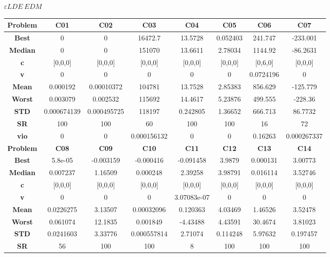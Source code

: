 \documentclass{IEEEtran}
\begin{document}
\begin{center}
$\varepsilon LDE\ EDM$\\
  \begin{tabular}{|c|c|c|c|c|c|c|c|}
    \hline 
    \textbf{Problem} & \textbf{C01} & \textbf{C02} & \textbf{C03} & \textbf{C04} & \textbf{C05} & \textbf{C06} & \textbf{C07} \\ 
    \hline\hline 
    \textbf{Best} & 0 & 0 & 16472.7 & 13.5728 & 0.052403 & 241.747 & -233.001\\ 
    \textbf{Median} & 0 & 0 & 151070 & 13.6611 & 2.78034 & 1144.92 & -86.2631\\ 
    \textbf{c} & [0,0,0] & [0,0,0] & [0,0,0] & [0,0,0] & [0,0,0] & [0,6,0] & [0,0,0]\\ 
    \textbf{v} & 0 & 0 & 0 & 0 & 0 & 0.0724196 & 0\\ 
    \textbf{Mean} & 0.000192 & 0.00010372 & 104781 & 13.7528 & 2.85383 & 856.629 & -125.779\\ 
    \textbf{Worst} & 0.003079 & 0.002532 & 115692 & 14.4617 & 5.23876 & 499.555 & -228.36\\ 
    \textbf{STD} & 0.000674139 & 0.000495725 & 118197 & 0.242805 & 1.36652 & 666.713 & 86.7732\\ 
    \textbf{SR} & 100 & 100 & 60 & 100 & 100 & 16 & 72\\ 
    \textbf{vio} & 0 & 0 & 0.000156132 & 0 & 0 & 0.16263 & 0.000267337\\ 
    \hline 
    \hline 
    \textbf{Problem} & \textbf{C08} & \textbf{C09} & \textbf{C10} & \textbf{C11} & \textbf{C12} & \textbf{C13} & \textbf{C14} \\ 
    \hline\hline 
    \textbf{Best} & 5.8e-05 & -0.003159 & -0.000416 & -0.091458 & 3.9879 & 0.000131 & 3.00773\\ 
    \textbf{Median} & 0.007237 & 1.16509 & 0.000248 & 2.39258 & 3.98791 & 0.016114 & 3.52746\\ 
    \textbf{c} & [0,0,0] & [0,0,0] & [0,0,0] & [0,0,0] & [0,0,0] & [0,0,0] & [0,0,0]\\ 
    \textbf{v} & 0 & 0 & 0 & 3.07083e-07 & 0 & 0 & 0\\ 
    \textbf{Mean} & 0.0226275 & 3.13507 & 0.00032096 & 0.120363 & 4.03469 & 1.46526 & 3.52478\\ 
    \textbf{Worst} & 0.061074 & 12.1835 & 0.001849 & -4.43488 & 4.43591 & 30.4674 & 3.81023\\ 
    \textbf{STD} & 0.0241603 & 3.33776 & 0.000557814 & 2.71074 & 0.114248 & 5.97632 & 0.197457\\ 
    \textbf{SR} & 56 & 100 & 100 & 8 & 100 & 100 & 100\\ 

\end{tabular}
\end{center}
\end{document}
